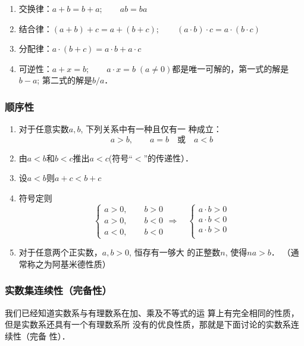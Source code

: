\begin{enumerate}
    \item 交换律：$a+b=b+a;\qquad  ab=ba$
    \item 结合律：$(a+b)+c=a+(b+c);\qquad (a\cdot b)\cdot c=a\cdot (b\cdot c)$
    \item 分配律：$a\cdot (b+c)=a\cdot b+a\cdot c$
   \item 可逆性：$a+x=b;\qquad a\cdot x=b\; (a\ne 0)$都是唯一可解的，第一式的解是$b-a$; 第二式的解是$b/a$．
\end{enumerate}

\subsubsection{顺序性}
\begin{enumerate}
    \item 对于任意实数$a,b$, 下列关系中有一种且仅有一
    种成立：
    \[a>b,\qquad a=b\quad \text{或}\quad a<b\]
    \item 由$a<b$和$b<c$推出$a<c$(符号“$<$”的传递性）．
    \item 设$a<b$则$a+c<b+c$
    \item 符号定则
    \[\begin{cases}
        a>0,\qquad b>0\\
        a>0,\qquad b<0\\
        a<0,\qquad b<0
    \end{cases}\Rightarrow\quad  \begin{cases}
        a\cdot b>0\\a\cdot b<0\\a\cdot b>0\\
    \end{cases}\]
    \item 对于任意两个正实数，$a,b>0$, 恒存有一够大
    的正整数$n$, 使得$na>b$． （通常称之为阿基米德性质）
\end{enumerate}

\subsubsection{ 实数集连续性（完备性）}
我们已经知道实数系与有理数系在加、乘及不等式的运
算上有完全相同的性质，但是实数系还具有一个有理数系所
没有的优良性质，那就是下面讨论的实数系连续性（完备
性）．

